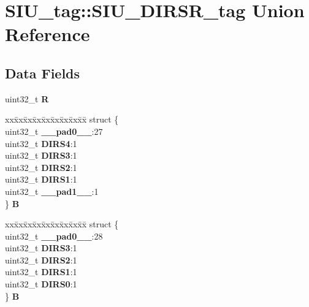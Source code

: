 \hypertarget{unionSIU__tag_1_1SIU__DIRSR__tag}{}\section{S\+I\+U\+\_\+tag\+::S\+I\+U\+\_\+\+D\+I\+R\+S\+R\+\_\+tag Union Reference}
\label{unionSIU__tag_1_1SIU__DIRSR__tag}
\subsection*{Data Fields}
\begin{DoxyCompactItemize}
\item 
\mbox{\label{unionSIU__tag_1_1SIU__DIRSR__tag_a85c6fd24f90ddba7672d3f8aad1b5d7d}} 
uint32\+\_\+t {\bfseries R}
\item 
\mbox{\label{unionSIU__tag_1_1SIU__DIRSR__tag_a27f771a2a212fbcf83e58bffc0ac9e16}} 
\begin{tabbing}
xx\=xx\=xx\=xx\=xx\=xx\=xx\=xx\=xx\=\kill
struct \{\\
\>uint32\_t {\bfseries \_\_pad0\_\_}:27\\
\>uint32\_t {\bfseries DIRS4}:1\\
\>uint32\_t {\bfseries DIRS3}:1\\
\>uint32\_t {\bfseries DIRS2}:1\\
\>uint32\_t {\bfseries DIRS1}:1\\
\>uint32\_t {\bfseries \_\_pad1\_\_}:1\\
\} {\bfseries B}\\

\end{tabbing}\item 
\mbox{\label{unionSIU__tag_1_1SIU__DIRSR__tag_a6b0614639e4227aa21ece25f07a78905}} 
\begin{tabbing}
xx\=xx\=xx\=xx\=xx\=xx\=xx\=xx\=xx\=\kill
struct \{\\
\>uint32\_t {\bfseries \_\_pad0\_\_}:28\\
\>uint32\_t {\bfseries DIRS3}:1\\
\>uint32\_t {\bfseries DIRS2}:1\\
\>uint32\_t {\bfseries DIRS1}:1\\
\>uint32\_t {\bfseries DIRS0}:1\\
\} {\bfseries B}\\


\end{tabbing}
\end{DoxyCompactItemize}
